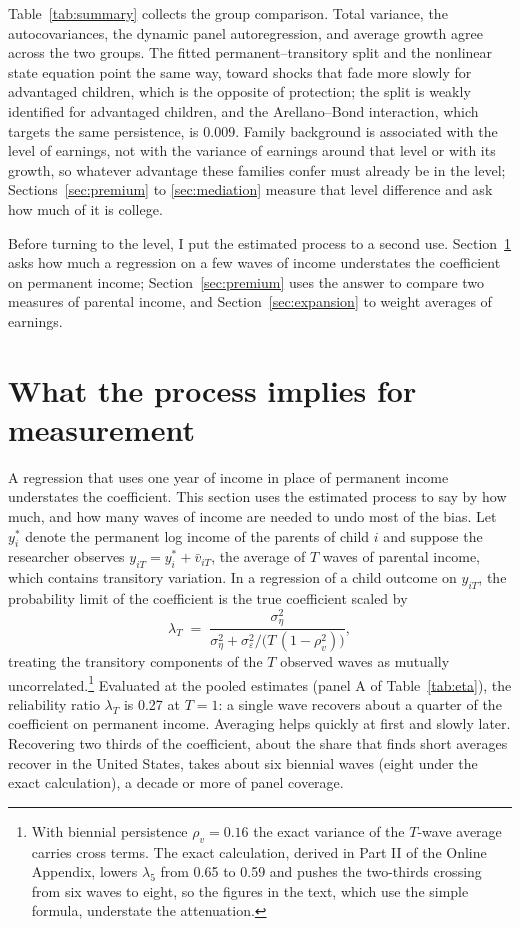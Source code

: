 \documentclass[11pt]{article}
\begin{document}
Table~\ref{tab:summary} collects the group comparison. Total variance,
the autocovariances, the dynamic panel autoregression, and average growth agree across the two groups. The fitted permanent--transitory split and the nonlinear state equation point the same way, toward shocks that fade more slowly for advantaged children, which is the opposite of protection; the split is weakly identified for
advantaged children, and the Arellano--Bond interaction, which targets the same persistence, is 0.009. Family
background is associated with the level of earnings, not with the variance of earnings around that level or with its growth, so whatever advantage these families confer must already be in the level; Sections~\ref{sec:premium} to \ref{sec:mediation} measure that level difference and ask how much of it is college.

Before turning to the level, I put the estimated process to a second use. Section~\ref{sec:measurement} asks how much a regression on a few waves of income understates the coefficient on permanent income; Section~\ref{sec:premium} uses the answer to compare two measures of parental income, and Section~\ref{sec:expansion} to weight averages of earnings.

\section{What the process implies for measurement}
\label{sec:measurement}

A regression that uses one year of income in place of permanent income
understates the coefficient. This section uses the estimated process to
say by how much, and how many waves of income are needed to undo most
of the bias. Let $y^*_i$ denote the permanent log income of the parents of child $i$
and suppose the researcher
observes $y_{iT} = y^*_i + \bar v_{iT}$, the average of $T$ waves of
parental income, which contains transitory variation. In a regression of a child
outcome on $y_{iT}$, the probability limit of the coefficient is the
true coefficient scaled by
\begin{equation}
\lambda_T \;=\; \frac{\sigma^2_\eta}
{\sigma^2_\eta + \sigma^2_\varepsilon / \big(T\,(1-\rho_v^2)\big)},
\label{eq:eta}
\end{equation}
treating the transitory components of the $T$ observed waves as mutually uncorrelated.\footnote{With biennial persistence $\rho_v = 0.16$ the exact variance of the $T$-wave average carries cross terms. The exact calculation, derived in Part II of the Online Appendix, lowers $\lambda_5$ from 0.65 to 0.59 and pushes the two-thirds crossing from six waves to eight, so the figures in the text, which use the simple formula, understate the attenuation.} Evaluated at the pooled estimates (panel A of Table~\ref{tab:eta}), the reliability ratio $\lambda_T$ is 0.27 at $T = 1$: a single wave recovers about a quarter of the coefficient on permanent income. Averaging helps quickly at first and slowly later. Recovering two thirds of the coefficient, about the share that \citet{Mazumder2005} finds short averages recover in the United States, takes about six biennial waves (eight under the exact calculation), a decade or more of panel coverage.
\end{document}

